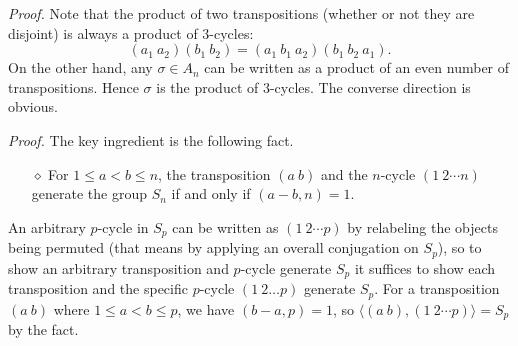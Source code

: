 \documentclass{mathproblems}
\begin{document}
\begin{questions}
\textit{Proof.} Note that the product of two transpositions (whether or not they are disjoint) is always a product of 3-cycles: 
$$
(a_{1} \ a_{2})(b_{1}\ b_{2})=(a_{1}\ b_{1}\ a_{2})(b_{1}\ b_{2}\ a_{1}).
$$
On the other hand, any $\sigma\in A_{n}$ can be written as a product of an even number of transpositions. Hence $\sigma$ is the product of 3-cycles. The converse direction is obvious.


\textit{Proof.} The key ingredient is the following fact. \vspace{-4pt}
\begin{itemize}
\item[$\diamond$] For $1\leq a<b\leq n$, the transposition $(a \ b)$ and the $n$-cycle $(1\ 2 \cdots n)$ generate the group $S_n$ if and only if $(a-b,n)=1$.
\end{itemize} \vspace{-4pt}
An arbitrary $p$-cycle in $S_p$ can be written as $(1\ 2 \cdots p)$ by relabeling the objects being permuted (that means by applying an overall conjugation on $S_p$), so to show an arbitrary transposition and $p$-cycle generate $S_p$ it suffices to show each transposition and the specific $p$-cycle $(1\ 2 \ldots p)$ generate $S_p$. For a transposition $(a\ b)$ where $1 \leq a<b \leq p$, we have $(b-a, p)=1$, so $\langle(a\ b),(1\ 2 \cdots p)\rangle=S_p$ by the fact. 


\end{questions}
\end{document}
